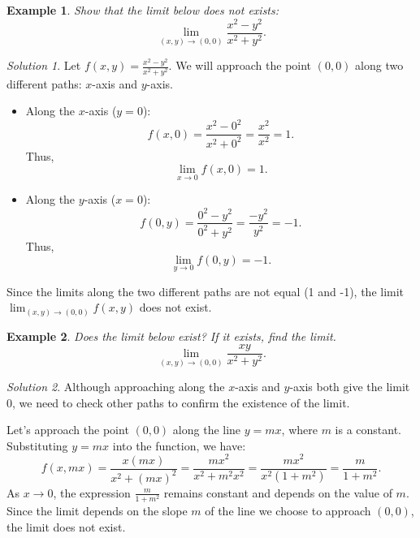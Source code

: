 \documentclass{book}
\newtheorem{example}{Example}[chapter]
\theoremstyle{remark}
\newtheorem*{solution}{Solution}
\begin{document}
\begin{example}
    Show that the limit below does not exists:
    \[
        \lim_{(x, y) \to (0, 0)} \frac{x^2 - y^2}{x^2 + y^2}.
    \]
\end{example}
\begin{solution}
    Let $f(x, y) = \frac{x^2 - y^2}{x^2 + y^2}$. We will approach the point $(0, 0)$ along two different paths: $x$-axis and $y$-axis.

    \begin{itemize}
        \item Along the $x$-axis ($y = 0$):
        \[
            f(x, 0) = \frac{x^2 - 0^2}{x^2 + 0^2} = \frac{x^2}{x^2} = 1.
        \]
        Thus,
        \[
            \lim_{x \to 0} f(x, 0) = 1.
        \]
        
        \item Along the $y$-axis ($x = 0$):
        \[
            f(0, y) = \frac{0^2 - y^2}{0^2 + y^2} = \frac{-y^2}{y^2} = -1.
        \]
        Thus,
        \[
            \lim_{y \to 0} f(0, y) = -1.
        \]
    \end{itemize}

    Since the limits along the two different paths are not equal (1 and -1), the limit $\lim_{(x, y) \to (0, 0)} f(x, y)$ does not exist.
\end{solution}

\begin{example}
    Does the limit below exist? If it exists, find the limit.
    \[
        \lim_{(x, y) \to (0, 0)} \frac{xy}{x^2 + y^2}.
    \]
\end{example}
\begin{solution}
    Although approaching along the $x$-axis and $y$-axis both give the limit 0, we need to check other paths to confirm the existence of the limit.

    Let's approach the point $(0, 0)$ along the line $y = mx$, where $m$ is a constant. Substituting $y = mx$ into the function, we have:
    \[
        f(x, mx) = \frac{x(mx)}{x^2 + (mx)^2} = \frac{mx^2}{x^2 + m^2x^2} = \frac{mx^2}{x^2(1 + m^2)} = \frac{m}{1 + m^2}.
    \]
    As $x \to 0$, the expression $\frac{m}{1 + m^2}$ remains constant and depends on the value of $m$. Since the limit depends on the slope $m$ of the line we choose to approach $(0, 0)$, the limit does not exist.
\end{solution}
\end{document}
